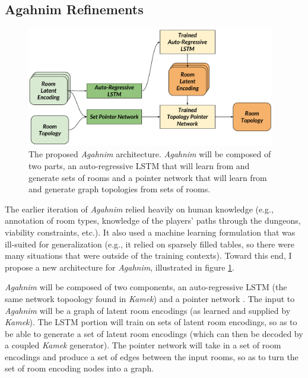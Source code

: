 \documentclass[12pt]{report}
\begin{document}
\subsection*{Agahnim Refinements}

\begin{figure}[ht]
\centering
    \includegraphics[width=0.97\textwidth]{figures/Agahnim Architecture.pdf} 
   
    \caption{The proposed \textit{Agahnim} architecture.  \textit{Agahnim} will be composed of two parts, an auto-regressive LSTM that will learn from and generate sets of rooms and a pointer network that will learn from and generate graph topologies from sets of rooms.}
  \label{fig:agahnim}
  \end{figure}


The earlier iteration of \textit{Agahnim} relied heavily on human knowledge (e.g., annotation of room types, knowledge of the players' paths through the dungeons, viability constraints, etc.).  It also used a machine learning formulation that was ill-suited for generalization (e.g., it relied on sparsely filled tables, so there were many situations that were outside of the training contexts).  Toward this end, I propose a new architecture for \textit{Agahnim}, illustrated in figure \ref{fig:agahnim}.

\textit{Agahnim} will be composed of two components, an auto-regressive LSTM (the same network topoology found in \textit{Kamek}) and a pointer network \cite{pointer_network}.  The input to \textit{Agahnim} will be a graph of latent room encodings (as learned and supplied by \textit{Kamek}).  The LSTM portion will train on sets of latent room encodings, so as to be able to generate a set of latent room encodings (which can then be decoded by a coupled \textit{Kamek} generator).  The pointer network will take in a set of room encodings and produce a set of edges between the input rooms, so as to turn the set of room encoding nodes into a graph.  
  
\end{document}
